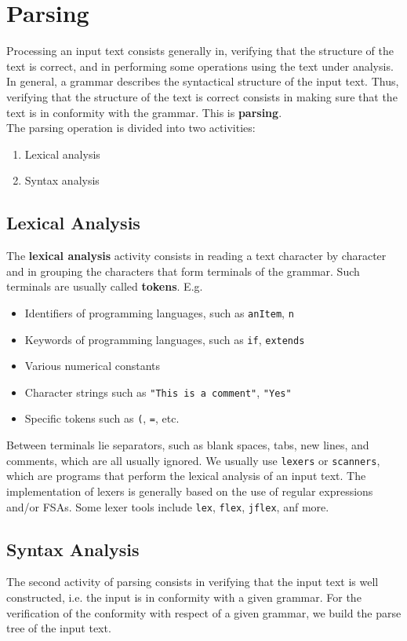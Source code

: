 \section{Parsing}
Processing an input text consists generally in, verifying that the
structure of the text is correct, and in performing some operations
using the text under analysis.\\

In general, a grammar describes the syntactical structure of the
input text. Thus, verifying that the structure of the text is correct
consists in making sure that the text is in conformity with the
grammar. This is \textbf{parsing}.\\

The parsing operation is divided into two activities:
\begin{enumerate}
  \item Lexical analysis
  \item Syntax analysis
\end{enumerate}
\subsection{Lexical Analysis}
The \textbf{lexical analysis} activity consists in reading a text character by
character and in grouping the characters that form terminals of the
grammar. Such terminals are usually called \textbf{tokens}. E.g.
\begin{itemize}
  \item Identifiers of programming languages, such as \texttt{anItem}, \texttt{n}
  \item Keywords of programming languages, such as \texttt{if}, \texttt{extends}
  \item Various numerical constants
  \item Character strings such as \texttt{"This is a comment"}, \texttt{"Yes"}
  \item Specific tokens such as \texttt{(}, \texttt{=}, etc.
\end{itemize}
Between terminals lie separators, such as blank spaces, tabs, new lines, and comments,
which are all usually ignored.
We usually use \texttt{lexers} or \texttt{scanners}, which are programs that perform 
the lexical analysis of an input text. The implementation of lexers 
is generally based on the use of regular expressions and/or FSAs. Some lexer tools
include \texttt{lex}, \texttt{flex}, \texttt{jflex}, anf more.
\subsection{Syntax Analysis}
The second activity of parsing consists in verifying that the input text is well constructed, i.e.
the input is in conformity with a given
grammar.
For the verification of the conformity with respect of a given
grammar, we build the parse tree of the input text.\\

